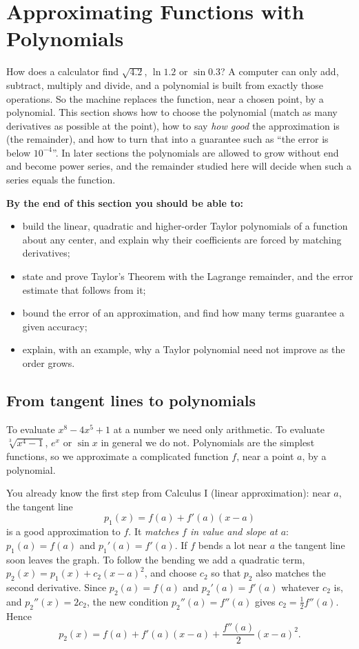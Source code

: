 \documentclass[11pt]{article}
\begin{document}
\section{Approximating Functions with Polynomials}

\begin{guide}
How does a calculator find $\sqrt{4.2}$, $\ln1.2$ or $\sin0.3$? A computer can only add, subtract, multiply and divide, and a polynomial is built from exactly those operations. So the machine replaces the function, near a chosen point, by a polynomial. This section shows how to choose the polynomial (match as many derivatives as possible at the point), how to say \emph{how good} the approximation is (the remainder), and how to turn that into a guarantee such as ``the error is below $10^{-4}$''. In later sections the polynomials are allowed to grow without end and become power series, and the remainder studied here will decide when such a series equals the function.
\end{guide}

\textbf{By the end of this section you should be able to:}
\begin{itemize}
  \item build the linear, quadratic and higher-order Taylor polynomials of a function about any center, and explain why their coefficients are forced by matching derivatives;
  \item state and prove Taylor's Theorem with the Lagrange remainder, and the error estimate that follows from it;
  \item bound the error of an approximation, and find how many terms guarantee a given accuracy;
  \item explain, with an example, why a Taylor polynomial need not improve as the order grows.
\end{itemize}

\subsection*{From tangent lines to polynomials}

To evaluate $x^8-4x^5+1$ at a number we need only arithmetic. To evaluate $\sqrt[3]{x^4-1}$, $e^x$ or $\sin x$ in general we do not. Polynomials are the simplest functions, so we approximate a complicated function $f$, near a point $a$, by a polynomial.

You already know the first step from Calculus I (linear approximation): near $a$, the tangent line
\[
p_1(x)=f(a)+f'(a)(x-a)
\]
is a good approximation to $f$. It \emph{matches $f$ in value and slope at $a$}: $p_1(a)=f(a)$ and $p_1'(a)=f'(a)$. If $f$ bends a lot near $a$ the tangent line soon leaves the graph. To follow the bending we add a quadratic term, $p_2(x)=p_1(x)+c_2(x-a)^2$, and choose $c_2$ so that $p_2$ also matches the second derivative. Since $p_2(a)=f(a)$ and $p_2'(a)=f'(a)$ whatever $c_2$ is, and $p_2''(x)=2c_2$, the new condition $p_2''(a)=f''(a)$ gives $c_2=\frac12f''(a)$. Hence
\[
p_2(x)=f(a)+f'(a)(x-a)+\frac{f''(a)}2(x-a)^2 .
\]
\end{document}
